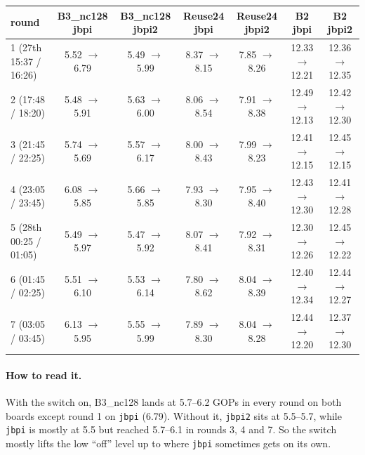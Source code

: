 \documentclass[10pt,a4paper]{article}
\begin{document}
\begin{center}\footnotesize\setlength{\tabcolsep}{4pt}
\begin{tabular}{@{}lcccccc@{}}
\toprule
round & B3\_nc128 jbpi & B3\_nc128 jbpi2 & Reuse24 jbpi & Reuse24 jbpi2 & B2 jbpi & B2 jbpi2 \\
\midrule
1 (27th 15:37 / 16:26) & 5.52 $\to$ 6.79 & 5.49 $\to$ 5.99 & 8.37 $\to$ 8.15 & 7.85 $\to$ 8.26 & 12.33 $\to$ 12.21 & 12.36 $\to$ 12.35 \\
2 (17:48 / 18:20) & 5.48 $\to$ 5.91 & 5.63 $\to$ 6.00 & 8.06 $\to$ 8.54 & 7.91 $\to$ 8.38 & 12.49 $\to$ 12.13 & 12.42 $\to$ 12.30 \\
3 (21:45 / 22:25) & 5.74 $\to$ 5.69 & 5.57 $\to$ 6.17 & 8.00 $\to$ 8.43 & 7.99 $\to$ 8.23 & 12.41 $\to$ 12.15 & 12.45 $\to$ 12.15 \\
4 (23:05 / 23:45) & 6.08 $\to$ 5.85 & 5.66 $\to$ 5.85 & 7.93 $\to$ 8.30 & 7.95 $\to$ 8.40 & 12.43 $\to$ 12.30 & 12.41 $\to$ 12.28 \\
5 (28th 00:25 / 01:05) & 5.49 $\to$ 5.97 & 5.47 $\to$ 5.92 & 8.07 $\to$ 8.41 & 7.92 $\to$ 8.31 & 12.30 $\to$ 12.26 & 12.45 $\to$ 12.22 \\
6 (01:45 / 02:25) & 5.51 $\to$ 6.10 & 5.53 $\to$ 6.14 & 7.80 $\to$ 8.62 & 8.04 $\to$ 8.39 & 12.40 $\to$ 12.34 & 12.44 $\to$ 12.27 \\
7 (03:05 / 03:45) & 6.13 $\to$ 5.95 & 5.55 $\to$ 5.99 & 7.89 $\to$ 8.30 & 8.04 $\to$ 8.28 & 12.44 $\to$ 12.20 & 12.37 $\to$ 12.30 \\
\bottomrule
\end{tabular}
\end{center}

\paragraph{How to read it.} With the switch on, B3\_nc128 lands at 5.7--6.2 GOPs in every round on both boards
except round 1 on \texttt{jbpi} (6.79). Without it, \texttt{jbpi2} sits at 5.5--5.7, while \texttt{jbpi} is mostly
at 5.5 but reached 5.7--6.1 in rounds 3, 4 and 7. So the switch mostly lifts the low ``off'' level up to where
\texttt{jbpi} sometimes gets on its own.
\end{document}

